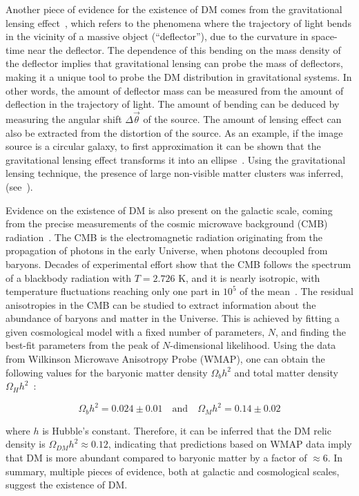 Another piece of evidence for the existence of DM comes from the gravitational lensing effect~\cite{Mellier:1998pk}, which refers to the
phenomena where the trajectory of light bends in the vicinity of a massive object (``deflector''), due to the curvature in 
space-time near the deflector. The dependence of this bending on the mass density of the deflector implies that gravitational
lensing can probe the mass of deflectors, making it a unique tool to probe the DM distribution in gravitational systems. In other words,
the amount of deflector mass can be measured from the amount of deflection in the trajectory of light. The amount of bending can be
deduced by measuring the angular shift $\Delta\vec{\theta}$ of the source. The amount of lensing effect can also be extracted from
the distortion of the source. As an example, if the image source is a circular galaxy, to first approximation it can be shown that
the gravitational lensing effect transforms it into an ellipse~\cite{Mellier:1998pk}. Using the gravitational lensing technique, the
presence of large non-visible matter clusters was inferred, (see~\cite{1988ApJ...332...75N}).

Evidence on the existence of DM is also present on the galactic scale, coming from the precise measurements of the cosmic
microwave background (CMB) radiation~\cite{Hu:1995kot}. The CMB is the electromagnetic radiation originating from the propagation of photons
in the early Universe, when photons decoupled from baryons. Decades of experimental effort show that the CMB follows 
the spectrum of a blackbody radiation with $T=2.726$ K, and it is nearly isotropic,
with temperature fluctuations reaching only one part in $10^{5}$ of the mean~\cite{Bertone:2004pz}.
The residual anisotropies in the CMB can be studied to extract information about the abundance of baryons and matter in the Universe. 
This is achieved by fitting
a given cosmological model with a fixed number of parameters, $N$, and finding the best-fit parameters from the peak of $N$-dimensional
likelihood. Using the data from Wilkinson Microwave Anisotropy Probe (WMAP), one can obtain the following values for the baryonic matter
density $\Omega_{b} h^{2}$ and total matter density $\Omega_{H} h^{2}$~\cite{Bertone:2004pz}:

\begin{equation}
    \Omega_{b} h^{2} = 0.024 \pm 0.01 \quad \textrm{and} \quad \Omega_{M} h^{2} = 0.14 \pm 0.02
\end{equation}

where $h$ is Hubble's constant. Therefore, it can be inferred that the DM relic density is $\Omega_{DM} h^2 \approx 0.12$, indicating that
predictions based on WMAP data imply that DM is more abundant compared to baryonic matter by a factor of $\approx 6$. In summary, multiple
pieces of evidence, both at galactic and cosmological scales, suggest the existence of DM. 

